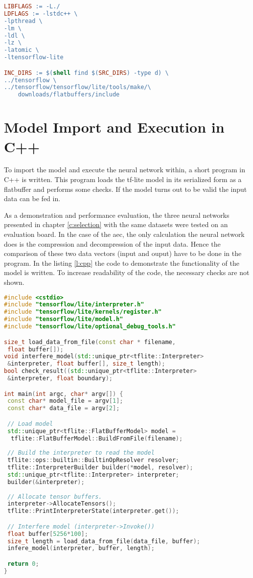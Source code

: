 \begin{lstlisting}[caption={Makefile}, language=make, label={l:make}]
LIBFLAGS := -L./
LDFLAGS := -lstdc++ \
-lpthread \
-lm \
-ldl \
-lz \
-latomic \
-ltensorflow-lite

INC_DIRS := $(shell find $(SRC_DIRS) -type d) \
../tensorflow \
../tensorflow/tensorflow/lite/tools/make/\
	downloads/flatbuffers/include
\end{lstlisting}

\section{Model Import and Execution in C++}
To import the model and execute the neural network within, a short program in C++ is written. This program loads the tf-lite model in its serialized form as a flatbuffer and performs some checks. If the model turns out to be valid the input data can be fed in. 

As a demonstration and performance evaluation, the three neural networks presented in chapter \ref{c:selection} with the same datasets were tested on an evaluation board. \newline
In the case of the \ac{aec}, the only calculation the neural network does is the compression and decompression of the input data. Hence the comparison of these two data vectors (input and ouput) have to be done in the program. \newline
In the listing \ref{l:cpp} the code to demonstrate the functionality of the model is written. To increase readability of the code, the necessary checks are not shown.

\begin{lstlisting}[caption={model-load}, language=c++, label={l:cpp}]
#include <cstdio>
#include "tensorflow/lite/interpreter.h"
#include "tensorflow/lite/kernels/register.h"
#include "tensorflow/lite/model.h"
#include "tensorflow/lite/optional_debug_tools.h"

size_t load_data_from_file(const char * filename,
 float buffer[]);
void interfere_model(std::unique_ptr<tflite::Interpreter> 
 &interpreter, float buffer[], size_t length);
bool check_result((std::unique_ptr<tflite::Interpreter> 
 &interpreter, float boundary);

int main(int argc, char* argv[]) {
 const char* model_file = argv[1];
 const char* data_file = argv[2];

 // Load model
 std::unique_ptr<tflite::FlatBufferModel> model =
  tflite::FlatBufferModel::BuildFromFile(filename);
	
 // Build the interpreter to read the model
 tflite::ops::builtin::BuiltinOpResolver resolver;
 tflite::InterpreterBuilder builder(*model, resolver);
 std::unique_ptr<tflite::Interpreter> interpreter;
 builder(&interpreter);
  
 // Allocate tensor buffers.
 interpreter->AllocateTensors();
 tflite::PrintInterpreterState(interpreter.get());

 // Interfere model (interpreter->Invoke())
 float buffer[5256*100];
 size_t length = load_data_from_file(data_file, buffer);
 infere_model(interpreter, buffer, length);

 return 0;
}
\end{lstlisting}


